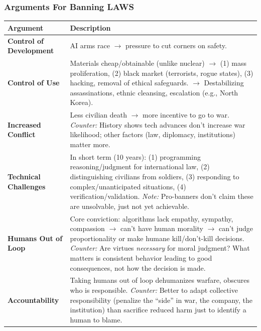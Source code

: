 \separator

\subsubsection{Arguments For Banning LAWS}

\begin{center}
\renewcommand{\arraystretch}{1.3}
\begin{tabular}{@{} l p{8.5cm} @{}}
\toprule
\textbf{Argument} & \textbf{Description} \\
\midrule
\textbf{Control of Development} & AI arms race $\to$ pressure to cut corners on safety. \\
\textbf{Control of Use} & Materials cheap/obtainable (unlike nuclear) $\to$ (1) mass proliferation, (2) black market (terrorists, rogue states), (3) hacking, removal of ethical safeguards. $\to$ Destabilizing assassinations, ethnic cleansing, escalation (e.g., North Korea). \\
\textbf{Increased Conflict} & Less civilian death $\to$ more incentive to go to war. \textit{Counter:} History shows tech advances don't increase war likelihood; other factors (law, diplomacy, institutions) matter more. \\
\textbf{Technical Challenges} & In short term (10 years): (1) programming reasoning/judgment for international law, (2) distinguishing civilians from soldiers, (3) responding to complex/unanticipated situations, (4) verification/validation. \textit{Note:} Pro-banners don't claim these are unsolvable, just not yet achievable. \\
\textbf{Humans Out of Loop} & Core conviction: algorithms lack empathy, sympathy, compassion $\to$ can't have human morality $\to$ can't judge proportionality or make humane kill/don't-kill decisions. \textit{Counter:} Are virtues \textit{necessary} for moral judgment? What matters is consistent behavior leading to good consequences, not how the decision is made. \\
\textbf{Accountability} & Taking humans out of loop dehumanizes warfare, obscures who is responsible. \textit{Counter:} Better to adapt collective responsibility (penalize the ``side'' in war, the company, the institution) than sacrifice reduced harm just to identify a human to blame. \\
\bottomrule
\end{tabular}
\end{center}

\separator

